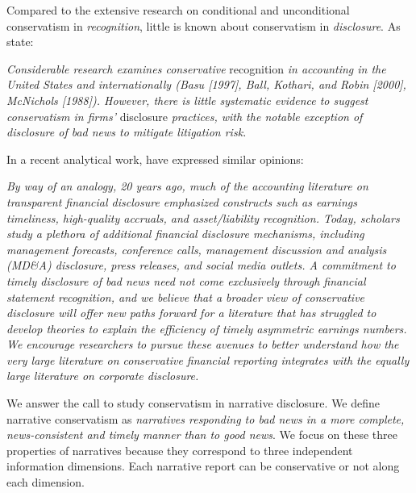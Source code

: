 \documentclass[letterpaper,11pt]{article}
\begin{document}
\begin{spacing}{1.5}
Compared to the extensive research on conditional and unconditional conservatism in \textit{recognition}, little is known about conservatism in \textit{disclosure}. As  state:
\begin{adjustwidth}{1cm}{1cm}
	\begin{singlespace}
		\textit{Considerable research examines conservative} recognition \textit{in accounting in the United States and internationally (Basu [1997], Ball, Kothari, and Robin [2000], McNichols [1988]). However, there is little systematic evidence to suggest conservatism in firms’} disclosure \textit{practices, with the notable exception of disclosure of bad news to mitigate litigation risk.}
	\end{singlespace}
\end{adjustwidth}
In a recent analytical work,  have expressed similar opinions:
\begin{adjustwidth}{1cm}{1cm}
	\begin{singlespace}
		\textit{By way of an analogy, 20 years ago, much of the accounting literature on transparent financial disclosure emphasized constructs such as earnings timeliness, high-quality accruals, and asset/liability recognition. Today, scholars study a plethora of additional financial disclosure mechanisms, including management forecasts, conference calls, management discussion and analysis (MD\&A) disclosure, press releases, and social media outlets. A commitment to timely disclosure of bad news need not come exclusively through financial statement recognition, and we believe that a broader view of conservative disclosure will offer new paths forward for a literature that has struggled to develop theories to explain the efficiency of timely asymmetric earnings numbers. We encourage researchers to pursue these avenues to better understand how the very large literature on conservative financial reporting integrates with the equally large literature on corporate disclosure.}
	\end{singlespace}
\end{adjustwidth}
We answer the call to study conservatism in narrative disclosure. We define narrative conservatism as \textit{narratives responding to bad news in a more complete, news-consistent and timely manner than to good news}. We focus on these three properties of narratives because they correspond to three independent information dimensions. Each narrative report can be conservative or not along each dimension.


\end{spacing}
\end{document}
